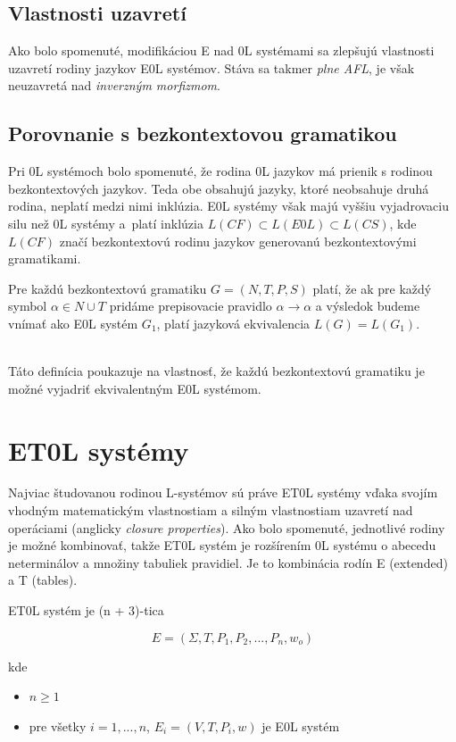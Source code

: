 \subsection*{Vlastnosti uzavretí}
Ako bolo spomenuté, modifikáciou E nad 0L systémami sa zlepšujú vlastnosti uzavretí rodiny jazykov E0L systémov. Stáva sa takmer \textit{plne AFL}, je však neuzavretá nad \textit{inverzným morfizmom}.

\subsection*{Porovnanie s bezkontextovou gramatikou}
Pri 0L systémoch bolo spomenuté, že rodina 0L jazykov má prienik s rodinou bezkontextových jazykov. Teda obe obsahujú jazyky, ktoré neobsahuje druhá rodina, neplatí medzi nimi inklúzia. E0L systémy však majú vyššiu vyjadrovaciu silu než 0L systémy a~platí inklúzia $L(CF) \subset L(E0L) \subset L(CS)$, kde $L(CF)$ značí bezkontextovú rodinu jazykov generovanú bezkontextovými gramatikami.

\begin{definition}
\label{BKGtoE0L}
Pre každú bezkontextovú gramatiku $G = (N, T, P, S)$ platí, že ak pre každý symbol $\alpha \in N \cup T$ pridáme prepisovacie pravidlo $\alpha \to \alpha$ a výsledok budeme vnímať ako E0L systém $G_1$, platí jazyková ekvivalencia $L(G) = L(G_1)$.
\end{definition}
\hfill\\
Táto definícia poukazuje na vlastnosť, že každú bezkontextovú gramatiku je možné vyjadriť ekvivalentným E0L systémom\cite{salomaa}.

\section{ET0L systémy}
Najviac študovanou rodinou L-systémov sú práve ET0L systémy vďaka svojím vhodným matematickým vlastnostiam a silným vlastnostiam uzavretí nad operáciami (anglicky \textit{closure properties}).
Ako bolo spomenuté, jednotlivé rodiny je možné kombinovať, takže ET0L systém je rozšírením 0L systému o abecedu neterminálov a množiny tabuliek pravidiel. Je to kombinácia rodín E (extended) a T (tables).

\begin{definition}
\label{ET0LDefinition}
ET0L systém je (n + 3)-tica

\[ E = (\Sigma, T, P_1, P_2, ..., P_n, w_o) \]

kde 

\begin{itemize}
    \itemsep0.2em 
    \item[] $n \geq 1$
    \item[] pre všetky $ i = 1, ..., n$, $E_i = (V, T, P_i, w)$ je E0L systém
\end{itemize}
\end{definition}
\hfill\\

